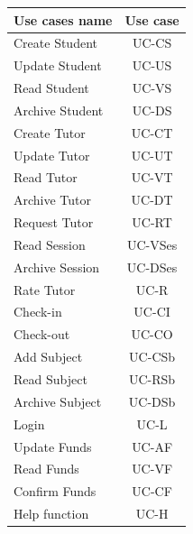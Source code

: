 \documentclass[12pt]{article}
\begin{document}
\begin{tabular}{| l | c |}

\hline

\textbf{Use cases name} & \textbf{Use case}	\\ \hline
			Create Student				&	UC-CS
			\\Update Student 			&	UC-US
			\\Read Student      		&	UC-VS
			\\Archive Student		&		UC-DS
			\\Create Tutor			&		UC-CT
			\\Update Tutor			&		UC-UT
			\\Read Tutor				&	UC-VT
			\\Archive Tutor			&		UC-DT
			\\Request Tutor			&		UC-RT
			\\Read Session				&	UC-VSes %
			\\Archive Session			&		UC-DSes %
			\\Rate Tutor				&	UC-R
			\\Check-in				&		UC-CI
			\\Check-out				&		UC-CO
			\\Add Subject			&		UC-CSb %
			\\Read Subject			&		UC-RSb
			\\Archive Subject		&		UC-DSb
			\\Login					&		UC-L
			\\Update Funds				&		UC-AF
			\\Read Funds				&		UC-VF
			\\Confirm Funds			&       UC-CF
			\\ Help function 		& 		UC-H			\\ \hline
\end{tabular}
\newpage		
		\newpage
\end{document}
